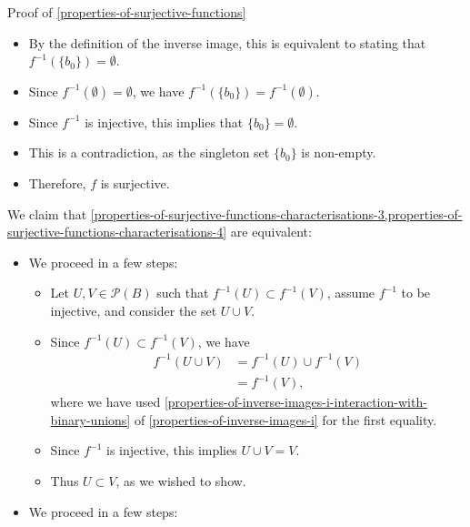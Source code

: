 \begin{Proof}{Proof of \cref{properties-of-surjective-functions}}
\begin{itemize}
\begin{itemize}
                \item By the definition of the inverse image, this is equivalent to stating that $f^{-1}(\{b_{0}\})=\emptyset$.
                \item Since $f^{-1}(\emptyset)=\emptyset$, we have $f^{-1}(\{b_{0}\})=f^{-1}(\emptyset)$.
                \item Since $f^{-1}$ is injective, this implies that $\{b_{0}\}=\emptyset$.
                \item This is a contradiction, as the singleton set $\{b_{0}\}$ is non-empty.
                \item Therefore, $f$ is surjective.
            \end{itemize}
    \end{itemize}

    We claim that \cref{properties-of-surjective-functions-characterisations-3,properties-of-surjective-functions-characterisations-4} are equivalent:
    \begin{itemize}
        \item{}We proceed in a few steps:
            \begin{itemize}
                \item Let $U,V\in\mathcal{P}(B)$ such that $f^{-1}(U)\subset f^{-1}(V)$, assume $f^{-1}$ to be injective, and consider the set $U\cup V$.
                \item Since $f^{-1}(U)\subset f^{-1}(V)$, we have
                    \begin{align*}
                        f^{-1}(U\cup V) &= f^{-1}(U)\cup f^{-1}(V)\\
                                        &= f^{-1}(V),
                    \end{align*}
                    where we have used \cref{properties-of-inverse-images-i-interaction-with-binary-unions} of \cref{properties-of-inverse-images-i} for the first equality.
                \item Since $f^{-1}$ is injective, this implies $U\cup V=V$.
                \item Thus $U\subset V$, as we wished to show.
            \end{itemize}
        \item{}We proceed in a few steps:

\end{itemize}
\end{Proof}
